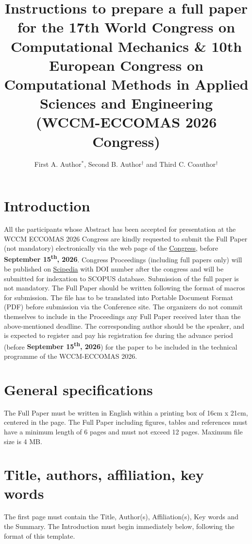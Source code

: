 \documentclass{WCCM-ECCOMAS_2026_Full_Paper}
\title{Instructions to prepare a full paper for the 17th World Congress on Computational Mechanics \& 10th European Congress on Computational Methods in Applied Sciences and Engineering\\(WCCM-ECCOMAS 2026 Congress)}
\author{First A. Author$^{*}$, Second B. Author$^{\dagger}$ and Third C. Coauthor$^{\dagger}$}
\begin{document}
\maketitle

\section{Introduction}

All the participants whose Abstract has been accepted for presentation at the WCCM ECCOMAS 2026 Congress are kindly requested to submit the Full Paper (not mandatory) electronically via the web page of the \href{https://www.wccm-eccomas2026.org/}{Congress}, before \textbf{September 15\textsuperscript{th}, 2026}. Congress Proceedings (including full papers only) will be published on \href{https://www.scipedia.com/}{Scipedia} with DOI number after the congress and will be submitted for indexation to SCOPUS database. Submission of the full paper is not mandatory. The Full Paper should be written following the format of macros for submission. The file has to be translated into Portable Document Format (PDF) before submission via the Conference site. The organizers do not commit themselves to include in the Proceedings any Full Paper received later than the above-mentioned deadline. The corresponding author should be the speaker, and is expected to register and pay his registration fee during the advance period (before \textbf{September 15\textsuperscript{th}, 2026}) for the paper to be included in the technical programme of the WCCM-ECCOMAS 2026.

\section{General specifications}

The Full Paper must be written in English within a printing box of 16cm x 21cm, centered in the page. The Full Paper including figures, tables and references must have a minimum length of 6 pages and must not exceed 12 pages. Maximum file size is 4 MB.

\section{Title, authors, affiliation, key words}

The first page must contain the Title, Author(s), Affiliation(s), Key words and the Summary. The Introduction must begin immediately below, following the format of this template.
\end{document}
